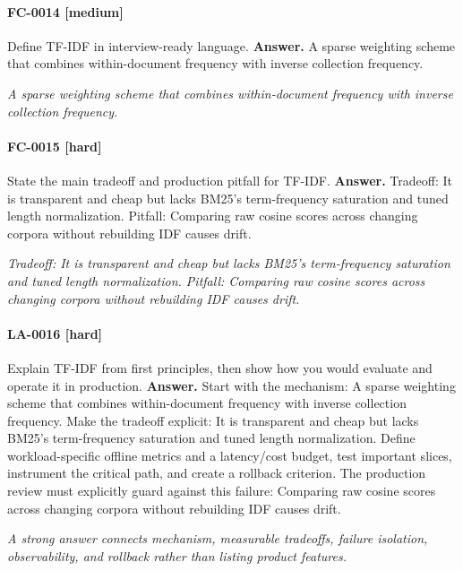 \paragraph{FC-0014 [medium]} Define TF-IDF in interview-ready language.
\noindent\textbf{Answer.} A sparse weighting scheme that combines within-document frequency with inverse collection frequency.
\par\textit{A sparse weighting scheme that combines within-document frequency with inverse collection frequency.}
\paragraph{FC-0015 [hard]} State the main tradeoff and production pitfall for TF-IDF.
\noindent\textbf{Answer.} Tradeoff: It is transparent and cheap but lacks BM25's term-frequency saturation and tuned length normalization. Pitfall: Comparing raw cosine scores across changing corpora without rebuilding IDF causes drift.
\par\textit{Tradeoff: It is transparent and cheap but lacks BM25's term-frequency saturation and tuned length normalization. Pitfall: Comparing raw cosine scores across changing corpora without rebuilding IDF causes drift.}
\paragraph{LA-0016 [hard]} Explain TF-IDF from first principles, then show how you would evaluate and operate it in production.
\noindent\textbf{Answer.} Start with the mechanism: A sparse weighting scheme that combines within-document frequency with inverse collection frequency. Make the tradeoff explicit: It is transparent and cheap but lacks BM25's term-frequency saturation and tuned length normalization. Define workload-specific offline metrics and a latency/cost budget, test important slices, instrument the critical path, and create a rollback criterion. The production review must explicitly guard against this failure: Comparing raw cosine scores across changing corpora without rebuilding IDF causes drift.
\par\textit{A strong answer connects mechanism, measurable tradeoffs, failure isolation, observability, and rollback rather than listing product features.}
